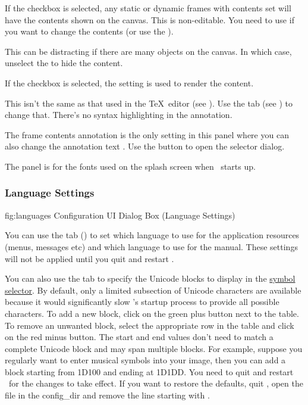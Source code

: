 If the  checkbox is
selected, any static or dynamic frames with contents set
will have the contents shown on the \gls{canvas}. This is
non-editable. You need to use 
if you want to change the contents (or use the ).

This can be distracting if there are many \glspl{object} on the
\gls{canvas}. In which case, unselect the 
 to hide the content.

If the  checkbox is
selected, the  setting is
used to render the content.

This isn't the same as that used in the 
\TeX\ editor (see ). Use the
 tab (see ) to
change that. There's no syntax highlighting in the annotation.

The frame contents annotation is the only setting in this panel
where you can also change the annotation text .
Use the  button to open the
 selector dialog.

The  panel is for the fonts used on the splash
screen when \FlowframTk\ starts up.

\subsubsection{Language Settings}\label{sec:languages}


\FloatFig
  {fig:languages}
  {}
  {Configuration UI Dialog Box (Language Settings)}

You can use the  tab
()
to set which language to use for the application
resources (menus, messages etc) and which language to use for
the manual. These settings will not be applied until you quit and
restart \FlowframTk.

You can also use the  tab to specify the
Unicode blocks to display in the
\hyperref[mi:insertsymbol]{symbol selector}. By default, only
a limited subsection of Unicode characters are available because it
would significantly slow \FlowframTk's startup process to provide
all possible characters. To add a new block, \gls{click} on the
green plus button next to the table. To remove an unwanted block,
select the appropriate row in the table and \gls{click} on the red minus
button. The start and end values don't need to match a complete
Unicode block and may span multiple blocks. For example, suppose you
regularly want to enter musical symbols into your image, then you
can add a block starting from 1D100 and ending at 1D1DD. You need to
quit and restart \FlowframTk\ for the changes to take effect. If you
want to restore the defaults, quit \FlowframTk, open the file
 in the \gls{config_dir} and remove
the line starting with .

